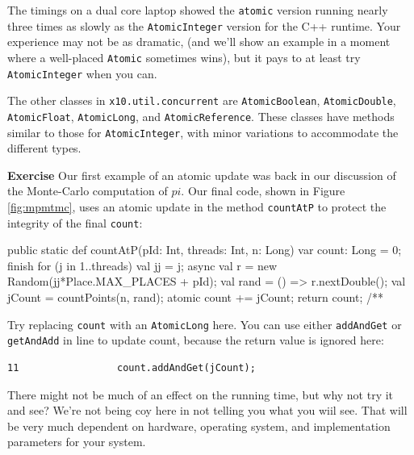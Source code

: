 The timings on a dual core laptop showed the {\tt atomic} version running nearly
three times as slowly as the {\tt AtomicInteger} version 
for the C++ runtime.  Your experience may not be as dramatic,
(and we'll show an example in a moment where a well-placed {\tt Atomic} sometimes wins),
but it pays to at least try {\tt AtomicInteger} when you can.

The other classes in {\tt x10.util.concurrent} are {\tt AtomicBoolean}, 
{\tt AtomicDouble}, {\tt AtomicFloat}, {\tt AtomicLong}, and
{\tt AtomicReference}.  These classes have methods similar to those for
{\tt AtomicInteger}, with minor variations to accommodate the different
types.

{\bf Exercise}  Our first example of an atomic update was back in
our discussion of the Monte-Carlo computation of $pi$.  Our final code,
shown in Figure \ref{fig:mpmtmc}, uses an atomic update in the
method {\tt countAtP} to protect the integrity of the final {\tt count}:
\begin{xtennum}[]
public static def countAtP(pId: Int, threads: Int, n: Long) {
    var count: Long = 0;
    finish for (j in 1..threads)  {
        val jj = j;
        async {
            val r = new Random(jj*Place.MAX_PLACES + pId);
            val rand = () => r.nextDouble();
            val jCount = countPoints(n, rand);
            atomic count += jCount;
        }
    }
    return count;
}
/**
\end{xtennum}
Try replacing {\tt count} with an {\tt AtomicLong} here.  You can use 
either {\tt addAndGet} or {\tt getAndAdd} in line 
to update count, because the return value is ignored here:
\begin{verbatim}
11                 count.addAndGet(jCount);
\end{verbatim}
There might not be much of an effect on the running time, but why not try it
and see?  We're not being coy here in not telling you what you wiil
see.  That will be very much dependent
on hardware, operating system, and implementation parameters for your system.

